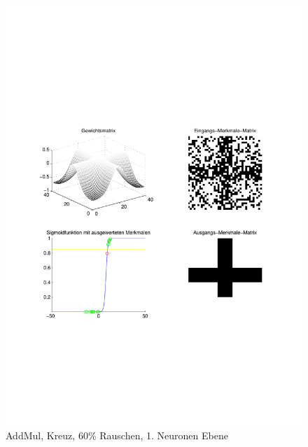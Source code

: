 \begin{figure}[hbt]
	\begin{minipage}{0.8 \textwidth}
		\includegraphics[width=\textwidth]{./Bilder/Auswertung/Endergebnis/TypeAddMul_Rauschen60_Cross_Layer1}
		\caption{AddMul, Kreuz, 60\% Rauschen, 1. Neuronen Ebene}
		\label{AddMul_Kreuz_60_1}
	\end{minipage}
	\vfill
	\begin{minipage}{0.8 \textwidth}

\end{minipage}
\end{figure}
